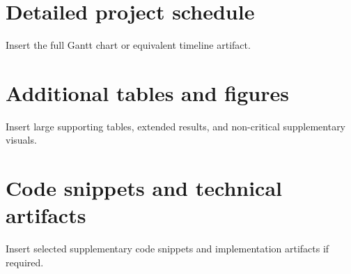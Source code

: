 \section{Detailed project schedule}
Insert the full Gantt chart or equivalent timeline artifact.

\section{Additional tables and figures}
Insert large supporting tables, extended results, and non-critical supplementary visuals.

\section{Code snippets and technical artifacts}
Insert selected supplementary code snippets and implementation artifacts if required.
